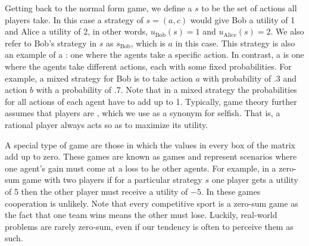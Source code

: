 Getting back to the normal form game, we define a  $s$ to
be the set of actions all players take. In this case a strategy of $s
= (a,c)$ would give Bob a utility of 1 and Alice a utility of 2, in
other words, $u_{\text{Bob}}(s) = 1$ and $u_{\text{Alice}}(s) = 2$.
We also refer to Bob's strategy in $s$ as $s_{\text{Bob}}$, which is
$a$ in this case. This strategy is also an example of a : one where the agents take a specific action. In contrast,
a  is one where the agents take different actions,
each with some fixed probabilities. For example, a mixed strategy for
Bob is to take action $a$ with probability of .3 and action $b$ with a
probability of .7. Note that in a mixed strategy the probabilities for
all actions of each agent have to add up to 1. Typically, game theory
further assumes that players are , which we use as a
synonym for selfish. That is, a rational player always acts so as to
maximize its utility.

A special type of game are those in which the values in every box of
the matrix add up to zero. These games are known as 
games and represent scenarios where one agent's gain must come at a
loss to he other agents. For example, in a zero-sum game with two
players if for a particular strategy $s$ one player gets a utility of
5 then the other player must receive a utility of $-5$.  In these
games cooperation is unlikely. Note that every competitive sport is a
zero-sum game as the fact that one team wins means the other must
lose.  Luckily, real-world problems are rarely zero-sum, even if our
tendency is often to perceive them as such.



